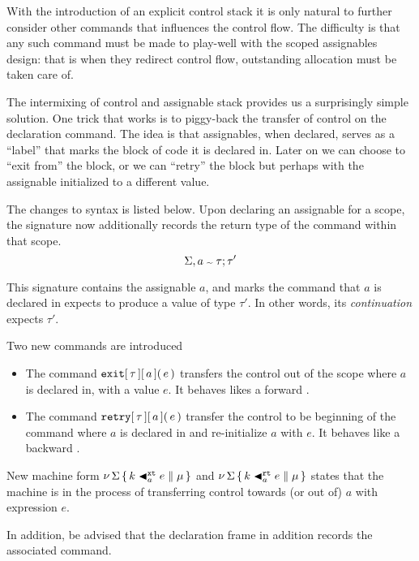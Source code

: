 \documentclass[11pt]{article}
\begin{document}


With the introduction of an explicit control stack it is only natural to further consider other commands that
influences the control flow. The difficulty is that any such command must be made to play-well with the scoped
assignables design: that is when they redirect control flow, outstanding allocation must be taken care of.

The intermixing of control and assignable stack provides us a surprisingly simple solution. One trick that works
is to piggy-back the transfer of control on the declaration command. The idea is that assignables, when declared,
serves as a ``label'' that marks the block of code it is declared in. Later on we can choose to ``exit from''
the block, or we can ``retry'' the block but perhaps with the assignable initialized to a different value.

The changes to syntax is listed below. Upon declaring an assignable for a scope, the signature now additionally
records the return type of the command within that scope.
$$
\Sigma, \HasSymK{a}{\tau}{\tau'}
$$

This signature contains the assignable $a$, and marks the command that $a$ is declared in expects to produce a
value of type $\tau'$. In other words, its \emph{continuation} expects $\tau'$.

Two new commands are introduced

\begin{itemize}
  \item The command ${{{\mathtt{exit}}\mathtt{[}\,{\tau}\,\mathtt{]}}\mathtt{[}\,{a}\,\mathtt{]}}\mathtt{(}\,e\,\mathtt{)}$ transfers the control out of the scope where $a$
        is declared in, with a value $e$. It behaves likes a forward .
  \item The command ${{{\mathtt{retry}}\mathtt{[}\,{\tau}\,\mathtt{]}}\mathtt{[}\,{a}\,\mathtt{]}}\mathtt{(}\,e\,\mathtt{)}$ transfer the control to be beginning of the command where
        $a$ is declared in and re-initialize $a$ with $e$. It behaves like a backward .
\end{itemize}

New machine form $\mathop{\nu}{\Sigma}\,\{\,{{k}\mathrel{\blacktriangleleft_{a}^{\mathtt{xt}}{e}}}\mathrel{\parallel}{\mu}\,\}$ and $\mathop{\nu}{\Sigma}\,\{\,{{k}\mathrel{\blacktriangleleft_{a}^{\mathtt{rt}}{e}}}\mathrel{\parallel}{\mu}\,\}$ states that the machine
is in the process of transferring control towards (or out of) $a$ with expression $e$.

In addition, be advised that the declaration frame in addition records the associated command.
\end{document}
